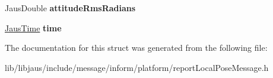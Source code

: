 \begin{DoxyCompactItemize}
\item 
\hypertarget{struct_report_local_pose_message_struct_ac4a7b3891c67ed111dfb3b580e7c414b}{\-Jaus\-Double {\bfseries attitude\-Rms\-Radians}}\label{struct_report_local_pose_message_struct_ac4a7b3891c67ed111dfb3b580e7c414b}

\item 
\hypertarget{struct_report_local_pose_message_struct_a5ae8906e222123bc60795a7129cf0e99}{\hyperlink{struct_jaus_time_struct}{\-Jaus\-Time} {\bfseries time}}\label{struct_report_local_pose_message_struct_a5ae8906e222123bc60795a7129cf0e99}

\end{DoxyCompactItemize}


\-The documentation for this struct was generated from the following file\-:\begin{DoxyCompactItemize}
\item 
lib/libjaus/include/message/inform/platform/report\-Local\-Pose\-Message.\-h\end{DoxyCompactItemize}
